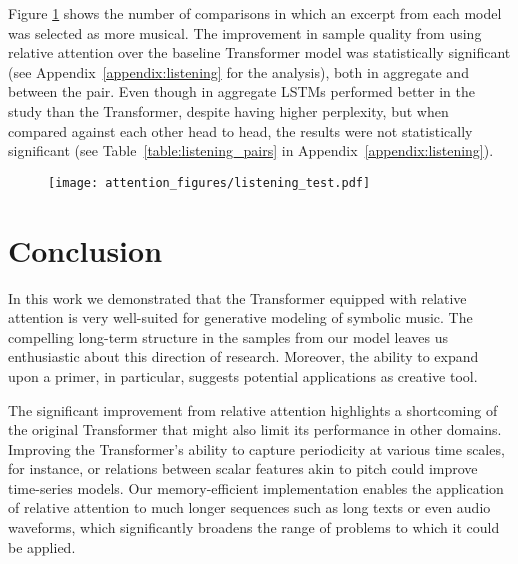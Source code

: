 \documentclass{article} \usepackage{iclr2019_conference,times}
\begin{document}
Figure \ref{fig:listening_tests} shows the number of comparisons in which an excerpt from each model was selected as more musical.  The improvement in sample quality from using relative attention over the baseline Transformer model was statistically significant (see Appendix~\ref{appendix:listening} for the analysis), both in aggregate and between the pair.  
Even though in aggregate LSTMs performed better in the study than the Transformer, despite having higher perplexity, but when compared against each other head to head, the results were not statistically significant (see Table~\ref{table:listening_pairs} in Appendix~\ref{appendix:listening}). 
\begin{figure}[h]
\begin{center}
\texttt{[image: attention\_figures/listening\_test.pdf]}


\label{fig:listening_tests}
\end{center}
\end{figure}



\section{Conclusion}

In this work we demonstrated that the Transformer equipped with relative attention is very well-suited for generative modeling of symbolic music. The compelling long-term structure in the samples from our model leaves us enthusiastic about this direction of research. Moreover, the ability to expand upon a primer, in particular, suggests potential applications as creative tool.

The significant improvement from relative attention highlights a shortcoming of the original Transformer that might also limit its performance in other domains. Improving the Transformer's ability to capture periodicity at various time scales, for instance, or relations between scalar features akin to pitch could improve time-series models.
Our memory-efficient implementation enables the application of relative attention to much longer sequences such as long texts or even audio waveforms, which significantly broadens the range of problems to which it could be applied.
\end{document}
